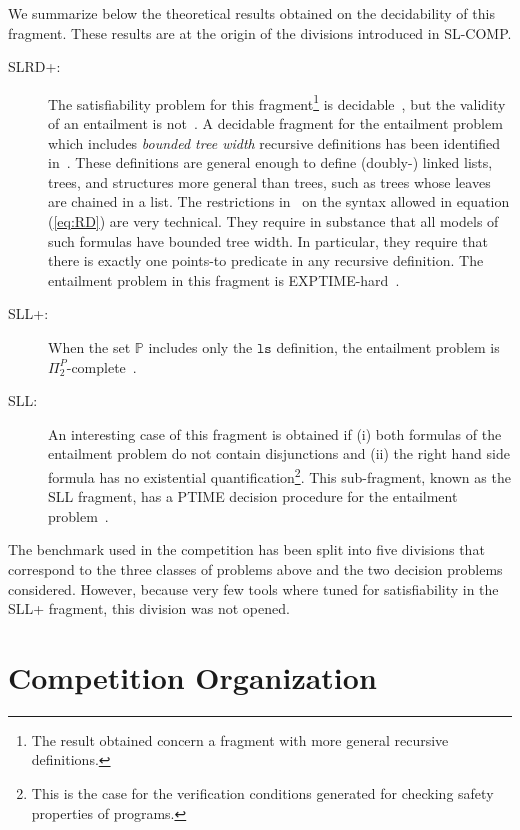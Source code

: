 \documentclass{llncs}
\newcommand{\preds}{\mathbb{P}}
\newcommand{\ls}{\mathtt{ls}}
\begin{document}
We summarize below the theoretical results obtained on the decidability of this fragment.
These results are at the origin of the divisions introduced in SL-COMP.
\begin{description}
\item[SLRD+:]
The satisfiability problem for this fragment\footnote{The result obtained concern a fragment with more general recursive definitions.} is decidable~\cite{BrotherstonFGNP13},
but the validity of an entailment is not~\cite{AntonopoulosGHKO14}.
%
A decidable fragment for the entailment problem which includes \emph{bounded tree width} recursive definitions has been identified in~\cite{IosifRS13}.
These definitions are general enough to define (doubly-) linked lists, trees,
and structures more general than trees, such as trees whose leaves are chained in
a list. 
The restrictions in~\cite{IosifRS13} on the syntax allowed in equation (\ref{eq:RD}) are very technical. They require in substance that all models of such formulas have bounded tree width. 
In particular, they require that there is exactly one points-to predicate in any recursive definition.
The entailment problem in this fragment is EXPTIME-hard~\cite{AntonopoulosGHKO14}.

\item[SLL+:]
When the set $\preds$ includes only the $\ls$ definition, 
the entailment problem is $\Pi^P_2$-complete~\cite{AntonopoulosGHKO14}.

\item[SLL:]
An interesting case of this fragment is obtained if 
(i) both formulas of the entailment problem do not contain disjunctions and 
(ii) the right hand side formula has no existential quantification\footnote{This is the case for the verification conditions generated for checking safety properties of programs.}. 
This sub-fragment, known as the SLL fragment, has a PTIME decision procedure for the entailment problem~\cite{CookHOPW11}.
\end{description}

The benchmark used in the competition has been split into five divisions that correspond to the three classes of problems above and the two decision problems considered.
However, because very few tools where tuned for satisfiability in the SLL+ fragment, this division was not opened.



\section{Competition Organization}
\end{document}
